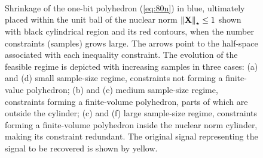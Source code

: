 \documentclass[12pt,draftcls,onecolumn]{IEEEtran}
\begin{document}
\begin{figure}[t]
	\centering
	\\
	\caption{Shrinkage of the one-bit polyhedron (\ref{eq:80n}) in blue, ultimately placed within the unit ball of the nuclear norm $\left\|\mathbf{X}\right\|_{\star}\leq 1$ shown with black cylindrical region and its red contours, when the number constraints (samples) grows large. The arrows point to the half-space associated with each inequality constraint. The evolution of the feasible regime is depicted with increasing samples in three cases: (a) and (d) small sample-size regime, constraints not forming a finite-value polyhedron; (b) and (e) medium sample-size regime, constraints forming a finite-volume polyhedron, parts of which are outside the cylinder; (c) and (f) large sample-size regime, constraints forming a finite-volume polyhedron inside the nuclear norm cylinder, making its constraint redundant. The original signal representing the signal to be recovered is shown by yellow.
    \vspace{-15pt}
	}
	\label{figure_1n}
\end{figure}
\end{document}
